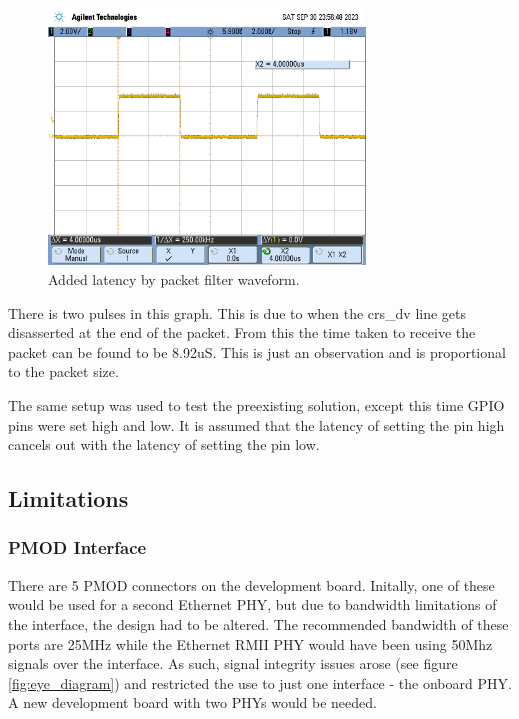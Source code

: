 \begin{figure}[h!]
    \centering
    \includegraphics[width=0.75\textwidth]{Images/scope_4.png}
    \caption[Added latency by packet filter waveform]{Added latency by packet filter waveform.}
    \label{fig:pf_added_latency}
\end{figure}

There is two pulses in this graph. This is due to when the crs\_dv line gets disasserted at the end of the packet. From this the time taken to receive the packet can be found to be 8.92uS. This is just an observation and is proportional to the packet size.



The same setup was used to test the preexisting solution, except this time GPIO pins were set high and low. It is assumed that the latency of setting the pin high cancels out with the latency of setting the pin low. 

\subsection{Limitations}
\subsubsection{PMOD Interface}

There are 5 PMOD connectors on the development board. Initally, one of these would be used for a second Ethernet PHY, but due to bandwidth limitations of the interface, the design had to be altered. The recommended bandwidth of these ports are 25MHz while the Ethernet RMII PHY would have been using 50Mhz signals over the interface. As such, signal integrity issues arose (see figure \ref{fig:eye_diagram}) and restricted the use to just one interface - the onboard PHY. A new development board with two PHYs would be needed.

